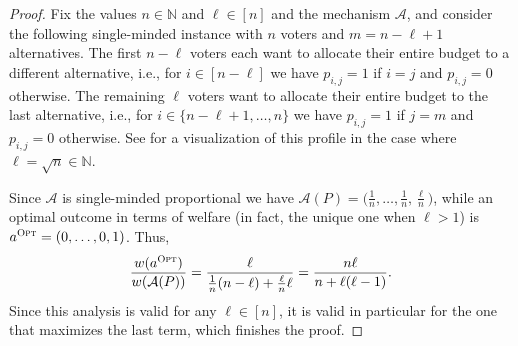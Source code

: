 \documentclass[11pt]{article}
\newcommand{\A}{\mathcal{A}}
\newcommand{\N}{\mathbb{N}}
\newcommand{\opt}{\textsc{Opt}}
\begin{document}
\begin{proof}
    Fix the values $n\in \N$ and $\ell\in [n]$ and the mechanism $\A$, and consider the following single-minded instance with $n$ voters and $m = n-\ell+1$ alternatives.
    The first $n-\ell$ voters each want to allocate their entire budget to a different alternative, i.e., for $i \in [n-\ell]$ we have $p_{i,j} = 1$ if $i = j$ and $p_{i,j} = 0$ otherwise. The remaining $\ell$ voters want to allocate their entire budget to the last alternative, i.e., for $i \in \{n-\ell+1, \dots, n\}$ we have $p_{i,j} = 1$ if $j = m$ and $p_{i,j} = 0$ otherwise. See  for a visualization of this profile in the case where $\ell=\sqrt{n}\in \N$.

    Since $\A$ is single-minded proportional we have $\A(P) = \big(\frac{1}{n}, \dots, \frac{1}{n}, \frac{\ell}{n}\big)$, while an optimal outcome in terms of welfare (in fact, the unique one when $\ell>1$) is $a^\opt = (0, \dots, 0, 1)$. Thus,
    \[
        \frac{w(a^\opt)}{w(\A(P))} = \frac{\ell}{\frac{1}{n}(n-\ell) + \frac{\ell}{n} \ell} = \frac{n\ell}{n+\ell(\ell-1)}.
    \]
    Since this analysis is valid for any $\ell\in [n]$, it is valid in particular for the one that maximizes the last term, which finishes the proof.
\end{proof}
\end{document}
